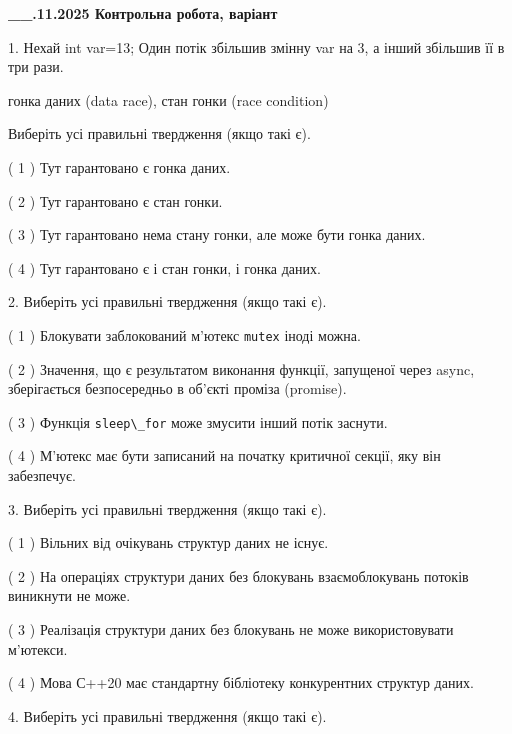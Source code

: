 \documentclass[12pt, ukrainian]{article}
\def\code#1{\Verb!#1!}
\begin{document}
\newpage
\begin {large}

\textbf{\_\_.11.2025 Контрольна робота, варіант  }\par


{
1. Нехай int var=13; Один потік збільшив змінну var на 3, а інший збільшив її в три рази.

гонка даних (data race), стан гонки (race condition)

Виберіть усі правильні твердження (якщо такі є).\par
\vspace{2mm}
( 1 ) Тут гарантовано є гонка даних.%

( 2 ) Тут гарантовано є стан гонки.%

( 3 ) Тут гарантовано нема стану гонки, але може бути гонка даних.%

( 4 ) Тут гарантовано є і стан гонки, і гонка даних.%


2. Виберіть усі правильні твердження (якщо такі є).\par
\vspace{2mm}

( 1 ) Блокувати заблокований м’ютекс  \code{mutex} іноді можна.%

( 2 ) Значення, що є результатом виконання функції, запущеної через async, зберігається безпосередньо в об’єкті проміза (promise).%

( 3 ) Функція \code{sleep\_for} може змусити інший потік заснути.%

( 4 ) М’ютекс має бути записаний на початку критичної секції, яку він забезпечує.%


3. Виберіть усі правильні твердження (якщо такі є).\par
\vspace{2mm}

( 1 ) Вільних від очікувань структур даних не існує.%

( 2 ) На операціях структури даних без блокувань взаємоблокувань потоків виникнути не може.%

( 3 ) Реалізація структури даних без блокувань не може використовувати м’ютекси.%

( 4 ) Мова С++20 має стандартну бібліотеку конкурентних структур даних.%


4. Виберіть усі правильні твердження (якщо такі є).\par
\vspace{2mm}

}
\end{large}
\end{document}
